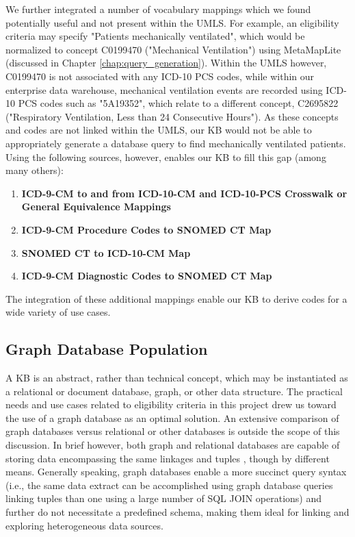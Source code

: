 \documentclass[../main.tex]{subfiles}
\begin{document}
We further integrated a number of vocabulary mappings which we found potentially useful and not present within the UMLS. For example, an eligibility criteria may specify "Patients mechanically ventilated", which would be normalized to concept C0199470 ("Mechanical Ventilation") using MetaMapLite (discussed in Chapter \ref{chap:query_generation}). Within the UMLS however, C0199470 is not associated with any ICD-10 PCS codes, while within our enterprise data warehouse, mechanical ventilation events are recorded using ICD-10 PCS codes such as "5A19352", which relate to a different concept, C2695822 ("Respiratory Ventilation, Less than 24 Consecutive Hours"). As these concepts and codes are not linked within the UMLS, our KB would not be able to appropriately generate a database query to find mechanically ventilated patients. Using the following sources, however, enables our KB to fill this gap (among many others):

\begin{enumerate}
    \item \textbf{ICD-9-CM to and from ICD-10-CM and ICD-10-PCS Crosswalk or General Equivalence Mappings} \cite{icd9_icd10_icd10pcs}
    \item \textbf{ICD-9-CM Procedure Codes to SNOMED CT Map} \cite{icd9proc_snomed}
    \item \textbf{SNOMED CT to ICD-10-CM Map} \cite{snomed_icd10}
    \item \textbf{ICD-9-CM Diagnostic Codes to SNOMED CT Map} \cite{icd9dx_snomed}
\end{enumerate}

The integration of these additional mappings enable our KB to derive codes for a wide variety of use cases.

\subsection{Graph Database Population}

A KB is an abstract, rather than technical concept, which may be instantiated as a relational or document database, graph, or other data structure. The practical needs and use cases related to eligibility criteria in this project drew us toward the use of a graph database as an optimal solution. An extensive comparison of graph databases versus relational or other databases is outside the scope of this discussion. In brief however, both graph and relational databases are capable of storing data encompassing the same linkages and tuples \cite{priyatna2014formalisation}, though by different means. Generally speaking, graph databases enable a more succinct query syntax (i.e., the same data extract can be accomplished using graph database queries linking tuples than one using a large number of SQL JOIN operations) and further do not necessitate a predefined schema, making them ideal for linking and exploring heterogeneous data sources.
\end{document}
